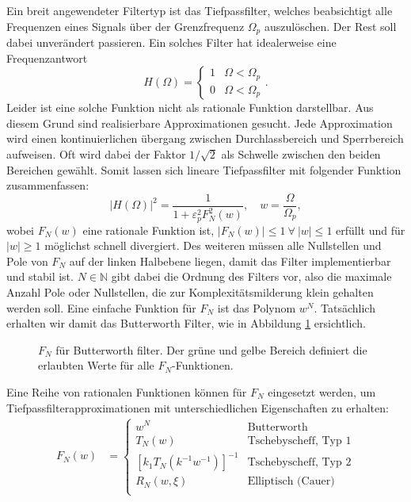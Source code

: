 Ein breit angewendeter Filtertyp ist das Tiefpassfilter, welches beabsichtigt alle Frequenzen eines Signals über der Grenzfrequenz $\Omega_p$ auszulöschen.
Der Rest soll dabei unverändert passieren.
Ein solches Filter hat idealerweise eine Frequenzantwort
\begin{equation} \label{ellfilter:eq:h_omega}
    H(\Omega) =
    \begin{cases}
        1  & \Omega < \Omega_p \\
        0  & \Omega < \Omega_p
    \end{cases}.
\end{equation}
Leider ist eine solche Funktion nicht als rationale Funktion darstellbar.
Aus diesem Grund sind realisierbare Approximationen gesucht.
Jede Approximation wird einen kontinuierlichen übergang zwischen Durchlassbereich und Sperrbereich aufweisen.
Oft wird dabei der Faktor $1/\sqrt{2}$ als Schwelle zwischen den beiden Bereichen gewählt.
Somit lassen sich lineare Tiefpassfilter mit folgender Funktion zusammenfassen:
\begin{equation} \label{ellfilter:eq:h_omega}
    | H(\Omega)|^2 = \frac{1}{1 + \varepsilon_p^2 F_N^2(w)}, \quad w=\frac{\Omega}{\Omega_p},
\end{equation}
wobei $F_N(w)$ eine rationale Funktion ist, $|F_N(w)| \leq 1 ~\forall~ |w| \leq 1$ erfüllt und für $|w| \geq 1$ möglichst schnell divergiert.
Des weiteren müssen alle Nullstellen und Pole von $F_N$ auf der linken Halbebene liegen, damit das Filter implementierbar und stabil ist.
$N \in \mathbb{N} $ gibt dabei die Ordnung des Filters vor, also die maximale Anzahl Pole oder Nullstellen, die zur Komplexitätsmilderung klein gehalten werden soll.
Eine einfache Funktion für $F_N$ ist das Polynom $w^N$.
Tatsächlich erhalten wir damit das Butterworth Filter, wie in Abbildung \ref{ellfilter:fig:butterworth} ersichtlich.
\begin{figure}
    \centering
    
    \caption{$F_N$ für Butterworth filter. Der grüne und gelbe Bereich definiert die erlaubten Werte für alle $F_N$-Funktionen.}
    \label{ellfilter:fig:butterworth}
\end{figure}
Eine Reihe von rationalen Funktionen können für $F_N$ eingesetzt werden, um Tiefpassfilter\-approximationen mit unterschiedlichen Eigenschaften zu erhalten:
\begin{align}
    F_N(w) & =
    \begin{cases}
        w^N                            & \text{Butterworth} \\
        T_N(w)                         & \text{Tschebyscheff, Typ 1}  \\
        [k_1 T_N (k^{-1} w^{-1})]^{-1} & \text{Tschebyscheff, Typ 2}  \\
        R_N(w, \xi)                    & \text{Elliptisch (Cauer)}    \\
    \end{cases}
\end{align}
